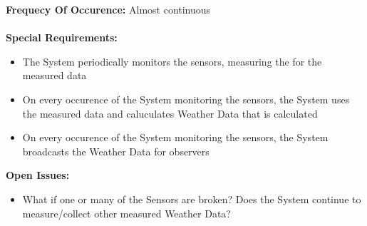 \documentclass[letterpaper]{article}
\begin{document}
\textbf{Frequecy Of Occurence: } Almost continuous\\\\
\textbf{Special Requirements:  }
\begin{itemize}
\item The System periodically monitors the sensors, measuring the
for the measured data
\item On every occurence of the System monitoring the sensors, the
System
uses the measured data and caluculates Weather Data that is calculated
\item On every occurence of the System monitoring the sensors, the
System broadcasts the Weather Data for observers
\end{itemize}
\textbf{Open Issues: }
\begin{itemize}
\item What if one or many of the Sensors are broken?  Does the System
continue to measure/collect other measured Weather Data?
\end{itemize}
\end{document}
